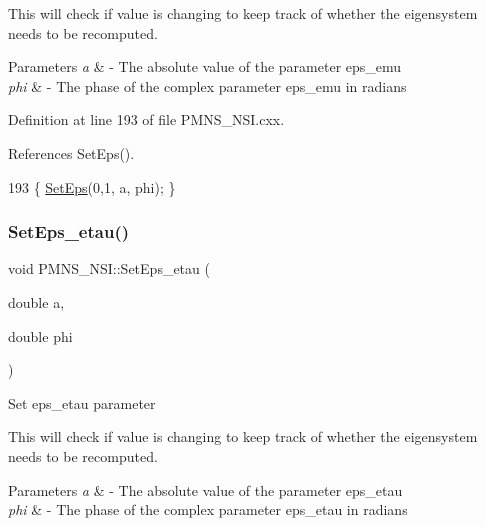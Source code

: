This will check if value is changing to keep track of whether the eigensystem needs to be recomputed.


\begin{DoxyParams}{Parameters}
{\em a} & -\/ The absolute value of the parameter eps\+\_\+emu \\
\hline
{\em phi} & -\/ The phase of the complex parameter eps\+\_\+emu in radians \\
\hline
\end{DoxyParams}


Definition at line 193 of file P\+M\+N\+S\+\_\+\+N\+S\+I.\+cxx.



References Set\+Eps().


\begin{DoxyCode}
193 \{ \hyperlink{classOscProb_1_1PMNS__NSI_a87c508149ea36b6de493a6817247a0ea}{SetEps}(0,1, a, phi); \}
\end{DoxyCode}
\mbox{\label{classOscProb_1_1PMNS__NSI_a73d43e6d267975d1545af922f8e81bb3}} 
\subsubsection{\texorpdfstring{Set\+Eps\+\_\+etau()}{SetEps\_etau()}}
{\footnotesize\ttfamily void P\+M\+N\+S\+\_\+\+N\+S\+I\+::\+Set\+Eps\+\_\+etau (\begin{DoxyParamCaption}\item[{double}]{a,  }\item[{double}]{phi }\end{DoxyParamCaption})\hspace{0.3cm}{\ttfamily [virtual]}}

Set eps\+\_\+etau parameter

This will check if value is changing to keep track of whether the eigensystem needs to be recomputed.


\begin{DoxyParams}{Parameters}
{\em a} & -\/ The absolute value of the parameter eps\+\_\+etau \\
\hline
{\em phi} & -\/ The phase of the complex parameter eps\+\_\+etau in radians \\
\hline
\end{DoxyParams}


